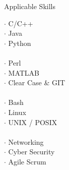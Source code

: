 \documentclass{resume} %
\begin{document}
\begin{rSection}{Applicable Skills}
	
	\begin{multicols}{4}
		
		$\cdot$ C/C++\\
		$\cdot$ Java \\
		$\cdot$ Python \\
		\\
		$\cdot$ Perl \\
		$\cdot$ MATLAB \\
		$\cdot$ Clear Case \& GIT\\
		\\
		$\cdot$ Bash \\
		$\cdot$ Linux\\
		$\cdot$ UNIX / POSIX\\
		\\
		$\cdot$ Networking\\
		$\cdot$ Cyber Security\\
		$\cdot$ Agile Scrum\\
		
	\end{multicols}
	
\end{rSection}




\end{document}
